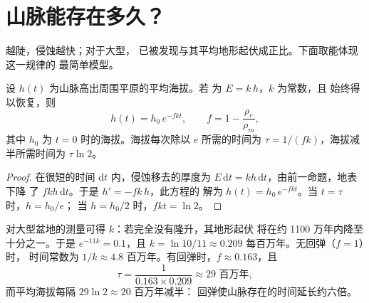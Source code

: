 \section{山脉能存在多久？}

越陡，侵蚀越快；对于大型，
已被发现与其平均地形起伏成正比。下面取能体现这一规律的
最简单模型。

\begin{proposition}[山脉的指数衰减]\label{prop:g12:destruction-of-mountains:decay}
设 $h(t)$ 为山脉高出周围平原的平均海拔。若
为 $E = k\,h$，$k$ 为常数，且
始终得以恢复，则
\[
  h(t) = h_0\, e^{-f k t}, \qquad f = 1 - \frac{\rho_c}{\rho_m},
\]
其中 $h_0$ 为 $t = 0$ 时的海拔。海拔每次除以 $e$ 所需的时间为
$\tau = 1/(fk)$，海拔减半所需时间为 $\tau \ln 2$。
\end{proposition}

\begin{proof}
在很短的时间 $\mathrm{d}t$ 内，侵蚀移去的厚度为 $E\,\mathrm{d}t
= k h\,\mathrm{d}t$，由前一命题，地表下降
了 $f k h\,\mathrm{d}t$。于是 $h' = -fk\,h$，此方程的
解为 $h(t) = h_0\,e^{-fkt}$。当 $t = \tau$ 时，$h = h_0/e$；
当 $h = h_0/2$ 时，$fkt = \ln 2$。
\end{proof}

对大型盆地的测量可得 $k$：若完全没有隆升，其地形起伏
将在约 1100 万年内降至十分之一。于是 $e^{-11k} = 0.1$，且 $k =
\ln 10/11 \approx 0.209$ 每百万年。无回弹（$f = 1$）时，
时间常数为 $1/k \approx 4.8$ 百万年。有回弹时，$f
\approx 0.163$，且
\[
  \tau = \frac{1}{0.163 \times 0.209} \approx 29 \text{ 百万年},
\]
而平均海拔每隔 $29 \ln 2 \approx 20$ 百万年减半：
回弹使山脉存在的时间延长约六倍。

